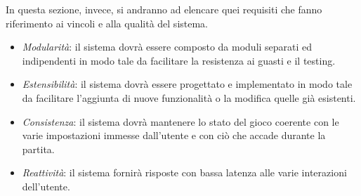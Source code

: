 In questa sezione, invece, si andranno ad elencare quei requisiti che fanno riferimento ai vincoli e alla qualità del sistema.
\begin{itemize}
	\item \textit{Modularità}: il sistema dovrà essere composto da moduli separati ed indipendenti in modo tale da facilitare la resistenza ai guasti e il testing.
	\item \textit{Estensibilità}: il sistema dovrà essere progettato e implementato in modo tale da facilitare l'aggiunta di nuove funzionalità o la modifica quelle già esistenti.
	\item \textit{Consistenza}: il sistema dovrà mantenere lo stato del gioco coerente con le varie impostazioni immesse dall'utente e con ciò che accade durante la partita.
	\item \textit{Reattività}: il sistema fornirà risposte con bassa latenza alle varie interazioni dell'utente.
\end{itemize}